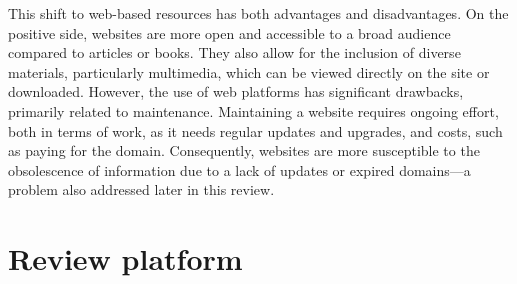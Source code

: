 This shift to web-based resources has both advantages and disadvantages. On the positive side, websites are more open and accessible to a broad audience compared to articles or books. They also allow for the inclusion of diverse materials, particularly multimedia, which can be viewed directly on the site or downloaded. However, the use of web platforms has significant drawbacks, primarily related to maintenance. Maintaining a website requires ongoing effort, both in terms of work, as it needs regular updates and upgrades, and costs, such as paying for the domain. Consequently, websites are more susceptible to the obsolescence of information due to a lack of updates or expired domains—a problem also addressed later in this review.

\section{Review platform}
